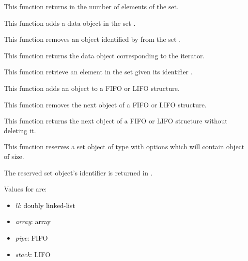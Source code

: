 	 {
	   This function returns in  the number of elements
	   of the set.
	 }

	 {
	   This function adds a data object in the set .
	 }

	 {
	   This function removes an object identified by 
	   from the set .
	 }

	 {
	   This function returns the data object corresponding to
	   the iterator.
	 }

         {
	   This function retrieve an element in the set given its
	   identifier .
	 }

	 {
	   This function adds an object to a FIFO or LIFO structure.
	 }

	 {
	   This function removes the next object of a FIFO or LIFO structure.
	 }

	 {
	   This function returns the next object of a FIFO or LIFO structure
	   without deleting it.
	 }

	 {
	   This function reserves a set object of type 
	   with options  which will contain object of
	    size.

	   The reserved set object's identifier is returned in
	   .

	   Values for  are:

	   \begin{itemize}
	     \item
	       \emph{ll}: doubly linked-list
	     \item
	       \emph{array}: array
	     \item
	       \emph{pipe}: FIFO
	     \item
	       \emph{stack}: LIFO
	   \end{itemize}
	 }

